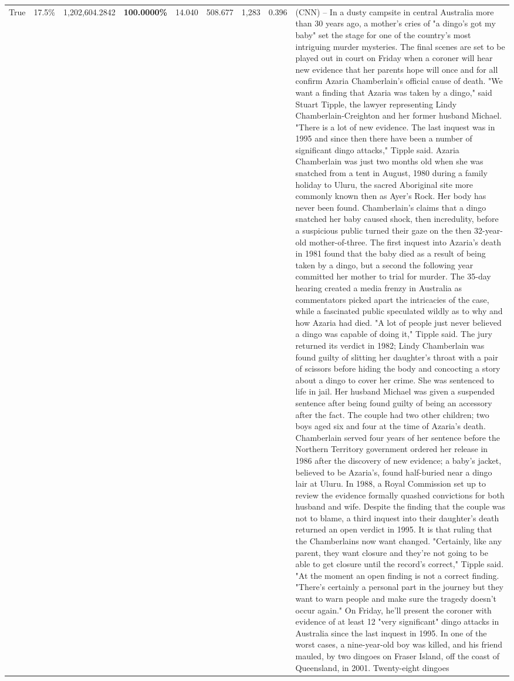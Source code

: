 \begin{table}[H]
\begin{tabular}{lllrlllll}
True & 17.5\% & 1,202,604.2842 & \bfseries \color{red} 100.0000\% & 14.040 & 508.677 & 1,283 & 0.396 & (CNN) -- In a dusty campsite in central Australia more than 30 years ago, a mother's cries of "a dingo's got my baby" set the stage for one of the country's most intriguing murder mysteries. The final scenes are set to be played out in court on Friday when a coroner will hear new evidence that her parents hope will once and for all confirm Azaria Chamberlain's official cause of death. "We want a finding that Azaria was taken by a dingo," said Stuart Tipple, the lawyer representing Lindy Chamberlain-Creighton and her former husband Michael. "There is a lot of new evidence. The last inquest was in 1995 and since then there have been a number of significant dingo attacks," Tipple said. Azaria Chamberlain was just two months old when she was snatched from a tent in August, 1980 during a family holiday to Uluru, the sacred Aboriginal site more commonly known then as Ayer's Rock. Her body has never been found. Chamberlain's claims that a dingo snatched her baby caused shock, then incredulity, before a suspicious public turned their gaze on the then 32-year-old mother-of-three. The first inquest into Azaria's death in 1981 found that the baby died as a result of being taken by a dingo, but a second the following year committed her mother to trial for murder. The 35-day hearing created a media frenzy in Australia as commentators picked apart the intricacies of the case, while a fascinated public speculated wildly as to why and how Azaria had died. "A lot of people just never believed a dingo was capable of doing it," Tipple said. The jury returned its verdict in 1982; Lindy Chamberlain was found guilty of slitting her daughter's throat with a pair of scissors before hiding the body and concocting a story about a dingo to cover her crime. She was sentenced to life in jail. Her husband Michael was given a suspended sentence after being found guilty of being an accessory after the fact. The couple had two other children; two boys aged six and four at the time of Azaria's death. Chamberlain served four years of her sentence before the Northern Territory government ordered her release in 1986 after the discovery of new evidence; a baby's jacket, believed to be Azaria's, found half-buried near a dingo lair at Uluru. In 1988, a Royal Commission set up to review the evidence formally quashed convictions for both husband and wife. Despite the finding that the couple was not to blame, a third inquest into their daughter's death returned an open verdict in 1995. It is that ruling that the Chamberlains now want changed. "Certainly, like any parent, they want closure and they're not going to be able to get closure until the record's correct," Tipple said. "At the moment an open finding is not a correct finding. "There's certainly a personal part in the journey but they want to warn people and make sure the tragedy doesn't occur again." On Friday, he'll present the coroner with evidence of at least 12 "very significant" dingo attacks in Australia since the last inquest in 1995. In one of the worst cases, a nine-year-old boy was killed, and his friend mauled, by two dingoes on Fraser Island, off the coast of Queensland, in 2001. Twenty-eight dingoes 
\end{tabular}
\end{table}
